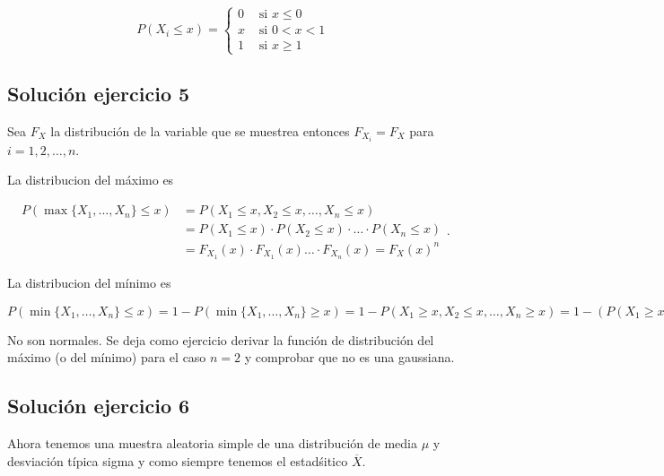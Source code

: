 \documentclass[]{article}
\begin{document}
\[
P(X_i\leq x)=
\left\{\begin{array}{ll}
0 & \mbox{ si } x\leq 0\\
x & \mbox{ si } 0< x < 1\\
1 & \mbox{ si }  x\geq 1
\end{array}
\right.
\]

\hypertarget{soluciuxf3n-ejercicio-5}{%
\subsection{Solución ejercicio 5}\label{soluciuxf3n-ejercicio-5}}

Sea \(F_X\) la distribución de la variable que se muestrea entonces
\(F_{X_i}=F_X\) para \(i=1,2,\ldots,n\).

La distribucion del máximo es

\[
\begin{array}{lr}
P(\max\{X_1,\ldots,X_n\}\leq x)&=P(X_1\leq x,X_2\leq x,\ldots, X_n\leq x)\\
&=P(X_1\leq x)\cdot P(X_2\leq x)\cdot\ldots\cdot P(X_n\leq x)\\
&=F_{X_1}(x)\cdot F_{X_1}(x)\ldots\cdot F_{X_n}(x)=F_{X}(x)^n
\end{array}.
\]

La distribucion del mínimo es

\(P(\min\{X_1,\ldots,X_n\}\leq x)=1-P(\min\{X_1,\ldots,X_n\}\geq x)= 1- P(X_1\geq x,X_2\leq x,\ldots, X_n\geq x)=1-\left(P(X_1\geq x)\cdot P(X_2\geq x)\cdot\ldots\cdot P(X_n\geq x)\right)=1-P(X_1\geq x)\cdot P(X_2\geq x)\cdot\ldots\cdot P(X_n\geq x)= 1-\left(1-P(X_1\leq x)\right) \cdot \left(1-P(X_1\leq x)\right)\cdot\ldots\cdot\left(1-P(X_1\leq x)\right)= 1-\left(1-F_{X}(x)\right)\cdot \left(1-F_{X}(x)\right)\ldots\cdot \left(1-F_{X}(x)\right)=1- (1-F_{X}(x))^n.\)

No son normales. Se deja como ejercicio derivar la función de
distribución del máximo (o del mínimo) para el caso \(n=2\) y comprobar
que no es una gaussiana.

\hypertarget{soluciuxf3n-ejercicio-6}{%
\subsection{Solución ejercicio 6}\label{soluciuxf3n-ejercicio-6}}

Ahora tenemos una muestra aleatoria simple de una distribución de media
\(\mu\) y desviación típica sigma y como siempre tenemos el estadśitico
\(\overline{X}\).
\end{document}
